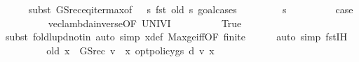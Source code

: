 \begin{isabellebody}
\ \ \ \ \isamarkupfalse%
\ {\isacharparenleft}{\kern0pt}subst\ GS{\isacharunderscore}{\kern0pt}rec{\isacharunderscore}{\kern0pt}eq{\isacharunderscore}{\kern0pt}iter{\isacharunderscore}{\kern0pt}max{\isacharbrackleft}{\kern0pt}of\ {\isacharunderscore}{\kern0pt}\ {\isachardoublequoteopen}{\isacharparenleft}{\kern0pt}{\isasymchi}\ s{\isachardot}{\kern0pt}\ fst\ {\isacharparenleft}{\kern0pt}{\isacharquery}{\kern0pt}old\ s{\isacharparenright}{\kern0pt}{\isacharparenright}{\kern0pt}{\isachardoublequoteclose}{\isacharbrackright}{\kern0pt}{\isacharcomma}{\kern0pt}\ goal{\isacharunderscore}{\kern0pt}cases{\isacharparenright}{\kern0pt}\isanewline
\ \ \ \ \ \ \isamarkupfalse%
\ {\isacharparenleft}{\kern0pt}{}\ s{\isacharparenright}{\kern0pt}\isanewline
\ \ \ \ \ \ \isamarkupfalse%
\ \isamarkupfalse%
\ {\isacharquery}{\kern0pt}case\isanewline
\ \ \ \ \ \ \ \ \isamarkupfalse%
\ vec{\isacharunderscore}{\kern0pt}lambda{\isacharunderscore}{\kern0pt}inverse{\isacharbrackleft}{\kern0pt}OF\ UNIV{\isacharunderscore}{\kern0pt}I{\isacharbrackright}{\kern0pt}\isanewline
\ \ \ \ \ \ \ \ \isamarkupfalse%
\ True\isanewline
\ \ \ \ \ \ \ \ \isamarkupfalse%
\ {\isacharparenleft}{\kern0pt}subst\ foldl{\isacharunderscore}{\kern0pt}upd{\isacharunderscore}{\kern0pt}notin{\isacharparenright}{\kern0pt}\ {\isacharparenleft}{\kern0pt}auto\ simp{\isacharcolon}{\kern0pt}\ x{\isacharprime}{\kern0pt}{\isacharunderscore}{\kern0pt}def\ Max{\isacharunderscore}{\kern0pt}ge{\isacharunderscore}{\kern0pt}iff{\isacharbrackleft}{\kern0pt}OF\ finite{\isacharbrackright}{\kern0pt}{\isacharparenright}{\kern0pt}\isanewline
\ \ \ \ \isamarkupfalse%
\ {\isacharparenleft}{\kern0pt}auto\ simp{\isacharcolon}{\kern0pt}\ fst{\isacharunderscore}{\kern0pt}IH{\isacharparenright}{\kern0pt}\isanewline
\ \ \ \ \isamarkupfalse%
\ \isamarkupfalse%
\ {\isachardoublequoteopen}{\isasymdots}\ {\isacharequal}{\kern0pt}\ {\isacharparenleft}{\kern0pt}{\isacharquery}{\kern0pt}old\ {\isacharparenleft}{\kern0pt}x\ {\isacharcolon}{\kern0pt}{\isacharequal}{\kern0pt}\ {\isacharparenleft}{\kern0pt}GS{\isacharunderscore}{\kern0pt}rec\ v\ {\isachardollar}{\kern0pt}\ x{\isacharcomma}{\kern0pt}\ opt{\isacharunderscore}{\kern0pt}policy{\isacharunderscore}{\kern0pt}gs{\isacharprime}{\kern0pt}\ d\ v\ x{\isacharparenright}{\kern0pt}{\isacharparenright}{\kern0pt}{\isacharparenright}{\kern0pt}{\isachardoublequoteclose}\isanewline
\ \ \ \ \ \ \isamarkupfalse%

\end{isabellebody}
